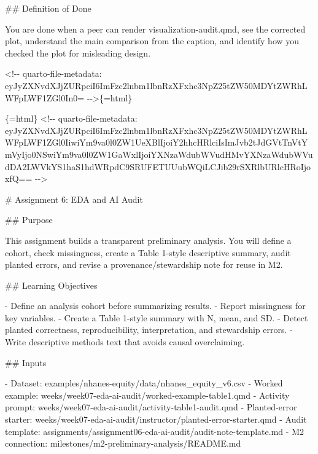 \documentclass[
  letterpaper,
  DIV=11,
  numbers=noendperiod,
  oneside]{scrreprt}
\newenvironment{Shaded}{\begin{snugshade}}{\end{snugshade}}
\newcommand{\FunctionTok}[1]{\textcolor[rgb]{0.28,0.35,0.67}{#1}}
\newcommand{\InformationTok}[1]{\textcolor[rgb]{0.37,0.37,0.37}{#1}}
\newcommand{\NormalTok}[1]{\textcolor[rgb]{0.00,0.23,0.31}{#1}}
\newcommand{\SpecialStringTok}[1]{\textcolor[rgb]{0.13,0.47,0.30}{#1}}
\begin{document}
\begin{Shaded}
\begin{Highlighting}[numbers=left,,]
\FunctionTok{\#\# Definition of Done}

\NormalTok{You are done when a peer can render }\InformationTok{\textasciigrave{}visualization{-}audit.qmd\textasciigrave{}}\NormalTok{, see the corrected plot, understand the main comparison from the caption, and identify how you checked the plot for misleading design.}


\InformationTok{\textasciigrave{}\textless{}!{-}{-} quarto{-}file{-}metadata: eyJyZXNvdXJjZURpciI6ImFzc2lnbm1lbnRzXFxhc3NpZ25tZW50MDYtZWRhLWFpLWF1ZGl0In0= {-}{-}\textgreater{}\textasciigrave{}}\NormalTok{\{=html\}}

\InformationTok{\textasciigrave{}\textasciigrave{}\textasciigrave{}\{=html\}}
\InformationTok{\textless{}!{-}{-} quarto{-}file{-}metadata: eyJyZXNvdXJjZURpciI6ImFzc2lnbm1lbnRzXFxhc3NpZ25tZW50MDYtZWRhLWFpLWF1ZGl0IiwiYm9va0l0ZW1UeXBlIjoiY2hhcHRlciIsImJvb2tJdGVtTnVtYmVyIjo0NSwiYm9va0l0ZW1GaWxlIjoiYXNzaWdubWVudHMvYXNzaWdubWVudDA2LWVkYS1haS1hdWRpdC9SRUFETUUubWQiLCJib29rSXRlbURlcHRoIjoxfQ== {-}{-}\textgreater{}}
\InformationTok{\textasciigrave{}\textasciigrave{}\textasciigrave{}}

\FunctionTok{\# Assignment 6: EDA and AI Audit }


\FunctionTok{\#\# Purpose}

\NormalTok{This assignment builds a transparent preliminary analysis. You will define a cohort, check missingness, create a Table 1{-}style descriptive summary, audit planted errors, and revise a provenance/stewardship note for reuse in M2.}

\FunctionTok{\#\# Learning Objectives}

\SpecialStringTok{{-} }\NormalTok{Define an analysis cohort before summarizing results.}
\SpecialStringTok{{-} }\NormalTok{Report missingness for key variables.}
\SpecialStringTok{{-} }\NormalTok{Create a Table 1{-}style summary with N, mean, and SD.}
\SpecialStringTok{{-} }\NormalTok{Detect planted correctness, reproducibility, interpretation, and stewardship errors.}
\SpecialStringTok{{-} }\NormalTok{Write descriptive methods text that avoids causal overclaiming.}

\FunctionTok{\#\# Inputs}

\SpecialStringTok{{-} }\NormalTok{Dataset: }\InformationTok{\textasciigrave{}examples/nhanes{-}equity/data/nhanes\_equity\_v6.csv\textasciigrave{}}
\SpecialStringTok{{-} }\NormalTok{Worked example: }\InformationTok{\textasciigrave{}weeks/week07{-}eda{-}ai{-}audit/worked{-}example{-}table1.qmd\textasciigrave{}}
\SpecialStringTok{{-} }\NormalTok{Activity prompt: }\InformationTok{\textasciigrave{}weeks/week07{-}eda{-}ai{-}audit/activity{-}table1{-}audit.qmd\textasciigrave{}}
\SpecialStringTok{{-} }\NormalTok{Planted{-}error starter: }\InformationTok{\textasciigrave{}weeks/week07{-}eda{-}ai{-}audit/instructor/planted{-}error{-}starter.qmd\textasciigrave{}}
\SpecialStringTok{{-} }\NormalTok{Audit template: }\InformationTok{\textasciigrave{}assignments/assignment06{-}eda{-}ai{-}audit/audit{-}note{-}template.md\textasciigrave{}}
\SpecialStringTok{{-} }\NormalTok{M2 connection: }\InformationTok{\textasciigrave{}milestones/m2{-}preliminary{-}analysis/README.md\textasciigrave{}}


\end{Highlighting}
\end{Shaded}
\end{document}
